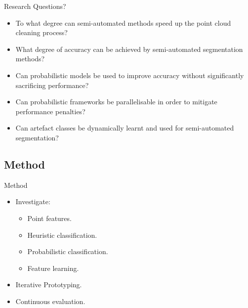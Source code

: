 \documentclass{beamer}
\begin{document}
\begin{frame}{Research Questions?}

\begin{itemize}
\item To what degree can semi-automated methods speed up the point cloud cleaning process?
\item What degree of accuracy can be achieved by semi-automated segmentation methods?
\item Can probabilistic models be used to improve accuracy without significantly sacrificing performance?
\item Can probabilistic frameworks be parallelisable in order to mitigate performance penalties?  
\item Can artefact classes be dynamically learnt and used for semi-automated segmentation?
\end{itemize}

\end{frame}

\subsection{Method}

\begin{frame}{Method}

\begin{itemize}
\item Investigate:
\begin{itemize}
  \item Point features.
  \item Heuristic classification.
  \item Probabilistic classification.
  \item Feature learning.
\end{itemize}
\item Iterative Prototyping.
\item Continuous evaluation.
\end{itemize}

\end{frame}
\end{document}
